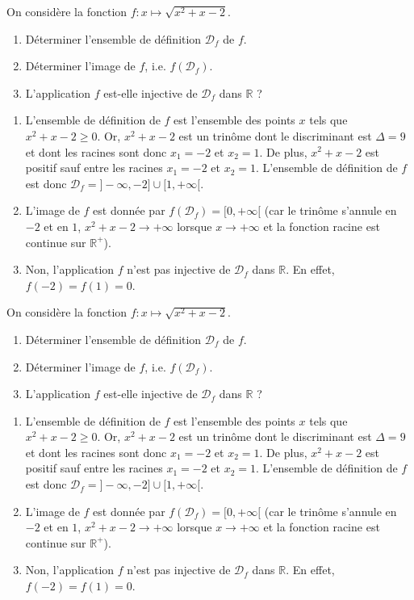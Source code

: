 \documentclass[a4paper, 11pt,openany]{book}%
\newtheorem[L]{thm}{Théorème}[section]
\newtheorem[M]{propo}[thm]{Proposition}
\newtheorem[M]{prop}[thm]{Propriété}
\newtheorem[M]{coro}[thm]{Corollaire}
\newtheorem[M]{lem}[thm]{Lemme}
\newtheorem[M,bodystyle=]{defi}[thm]{Définition}
\newtheorem[M,bodystyle=]{remark}[thm]{Remarque}
\newtheorem[M,bodystyle=]{met}[thm]{Méthode}
\newtheorem[M,bodystyle=]{ret}[thm]{A retenir}
\newtheorem[M,bodystyle=]{idee}[thm]{Idée}
\newtheorem[style=S,underline=false,bodystyle=]{exem}[thm]{Exemple}
\newtheorem[S,underline=false,bodystyle=]{exo}[thm]{Exercice}
\newtheorem[S,underline=false,bodystyle=]{appli}[thm]{Application}
\newtheorem[S,underline=false,bodystyle=]{sol}[thm]{Solution}
\newtheorem[S,underline=false,bodystyle=]{hypo}[thm]{Hypothesis}
\newtheorem[S,underline=false,bodystyle=]{nota}[thm]{Notation}
\newcommand{\R}{\mathbb{R}}
\newcommand{\calD}{\mathcal{D}}
\begin{document}
\begin{exo}
On considère la fonction 
$ f : x \mapsto \sqrt{x^2 + x - 2}$.
\begin{enumerate}
\item Déterminer l'ensemble de définition $\calD_f$ de $f$.
\item Déterminer l'image de $f$, i.e. $f(\calD_f)$.
\item L'application $f$ est-elle injective de $\calD_f$ dans $\R$ ?
\end{enumerate}
\end{exo}


\begin{sol}
\begin{enumerate}
\item L'ensemble de définition de $f$ est l'ensemble des points $x$ tels que $x^2 + x -2 \geqslant 0$. Or, $x^2 + x -2$ est un trinôme dont le discriminant est $\Delta = 9$ et dont les racines sont donc $x_1 = -2$ et $x_2 =1$. De plus, $x^2 +x -2$ est positif sauf entre les racines $x_1 = -2$ et $x_2= 1$. L'ensemble de définition de $f$ est donc $\calD_f = ]-\infty,-2] \cup [1, +\infty[$.
\item L'image de $f$ est donnée par $f(\calD_f) = [0,+\infty[$ (car le trinôme s'annule en $-2$ et en $1$, $x^2+x-2 \to + \infty$ lorsque $x \to + \infty$ et la fonction racine est continue sur $\R^+$).
\item Non, l'application $f$ n'est pas injective de $\calD_f$ dans $\R$. En effet, $f(-2) =  f(1)= 0$.
\end{enumerate}
\end{sol}

\begin{exo}
On considère la fonction 
$ f : x \mapsto \sqrt{x^2 + x - 2}$.
\begin{enumerate}
\item Déterminer l'ensemble de définition $\calD_f$ de $f$.
\item Déterminer l'image de $f$, i.e. $f(\calD_f)$.
\item L'application $f$ est-elle injective de $\calD_f$ dans $\R$ ?
\end{enumerate}
\end{exo}


\begin{sol}
\begin{enumerate}
\item L'ensemble de définition de $f$ est l'ensemble des points $x$ tels que $x^2 + x -2 \geqslant 0$. Or, $x^2 + x -2$ est un trinôme dont le discriminant est $\Delta = 9$ et dont les racines sont donc $x_1 = -2$ et $x_2 =1$. De plus, $x^2 +x -2$ est positif sauf entre les racines $x_1 = -2$ et $x_2= 1$. L'ensemble de définition de $f$ est donc $\calD_f = ]-\infty,-2] \cup [1, +\infty[$.
\item L'image de $f$ est donnée par $f(\calD_f) = [0,+\infty[$ (car le trinôme s'annule en $-2$ et en $1$, $x^2+x-2 \to + \infty$ lorsque $x \to + \infty$ et la fonction racine est continue sur $\R^+$).
\item Non, l'application $f$ n'est pas injective de $\calD_f$ dans $\R$. En effet, $f(-2) =  f(1)= 0$.
\end{enumerate}
\end{sol}
\end{document}
